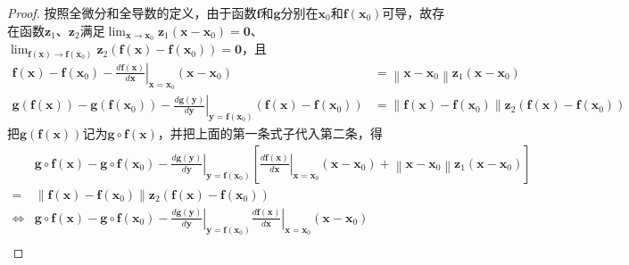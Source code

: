 \documentclass[main.tex]{subfiles}
\begin{document}
\begin{proof}
按照全微分和全导数的定义，由于函数$\mathbf{f}$和$\mathbf{g}$分别在$\mathbf{x}_0$和$\mathbf{f}\left(\mathbf{x}_0\right)$可导，故存在函数$\mathbf{z}_1$、$\mathbf{z}_2$满足$\lim_{\mathbf{x}\to\mathbf{x}_0}\mathbf{z}_1\left(\mathbf{x}-\mathbf{x}_0\right)=\mathbf{0}$、$\lim_{\mathbf{f}\left(\mathbf{x}\right)\to\mathbf{f}\left(\mathbf{x}_0\right)}\mathbf{z}_2\left(\mathbf{f}\left(\mathbf{x}\right)-\mathbf{f}\left(\mathbf{x}_0\right)\right)=\mathbf{0}$，且
\begin{align*}
\mathbf{f}\left(\mathbf{x}\right)-\mathbf{f}\left(\mathbf{x}_0\right)-\left.\frac{d\mathbf{f}\left(\mathbf{x}\right)}{d\mathbf{x}}\right|_{\mathbf{x}=\mathbf{x}_0}\left(\mathbf{x}-\mathbf{x}_0\right)&=\left\|\mathbf{x}-\mathbf{x}_0\right\|\mathbf{z}_1\left(\mathbf{x}-\mathbf{x}_0\right)\\
\mathbf{g}\left(\mathbf{f}\left(\mathbf{x}\right)\right)-\mathbf{g}\left(\mathbf{f}\left(\mathbf{x}_0\right)\right)-\left.\frac{d\mathbf{g}\left(\mathbf{y}\right)}{d\mathbf{y}}\right|_{\mathbf{y}=\mathbf{f}\left(\mathbf{x}_0\right)}\left(\mathbf{f}\left(\mathbf{x}\right)-\mathbf{f}\left(\mathbf{x}_0\right)\right)&=\left\|\mathbf{f}\left(\mathbf{x}\right)-\mathbf{f}\left(\mathbf{x}_0\right)\right\|\mathbf{z}_2\left(\mathbf{f}\left(\mathbf{x}\right)-\mathbf{f}\left(\mathbf{x}_0\right)\right)
\end{align*}
把$\mathbf{g}\left(\mathbf{f}\left(\mathbf{x}\right)\right)$记为$\mathbf{g}\circ\mathbf{f}\left(\mathbf{x}\right)$，并把上面的第一条式子代入第二条，得
\begin{align*}
&\mathbf{g}\circ\mathbf{f}\left(\mathbf{x}\right)-\mathbf{g}\circ\mathbf{f}\left(\mathbf{x}_0\right)-\left.\frac{d\mathbf{g}\left(\mathbf{y}\right)}{d\mathbf{y}}\right|_{\mathbf{y}=\mathbf{f}\left(\mathbf{x}_0\right)}\left[\left.\frac{d\mathbf{f}\left(\mathbf{x}\right)}{d\mathbf{x}}\right|_{\mathbf{x}=\mathbf{x}_0}\left(\mathbf{x}-\mathbf{x}_0\right)+\left\|\mathbf{x}-\mathbf{x}_0\right\|\mathbf{z}_1\left(\mathbf{x}-\mathbf{x}_0\right)\right]\\
=&\left\|\mathbf{f}\left(\mathbf{x}\right)-\mathbf{f}\left(\mathbf{x}_0\right)\right\|\mathbf{z}_2\left(\mathbf{f}\left(\mathbf{x}\right)-\mathbf{f}\left(\mathbf{x}_0\right)\right)\\
\Leftrightarrow&\mathbf{g}\circ\mathbf{f}\left(\mathbf{x}\right)-\mathbf{g}\circ\mathbf{f}\left(\mathbf{x}_0\right)-\left.\frac{d\mathbf{g}\left(\mathbf{y}\right)}{d\mathbf{y}}\right|_{\mathbf{y}=\mathbf{f}\left(\mathbf{x}_0\right)}\left.\frac{d\mathbf{f}\left(\mathbf{x}\right)}{d\mathbf{x}}\right|_{\mathbf{x}=\mathbf{x}_0}\left(\mathbf{x}-\mathbf{x}_0\right)\\

\end{align*}
\end{proof}
\end{document}

